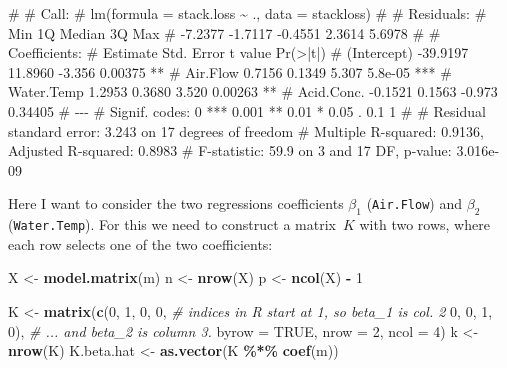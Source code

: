 \documentclass[
  a4paper,
]{article}
\newenvironment{Shaded}{\begin{snugshade}}{\end{snugshade}}
\newcommand{\AttributeTok}[1]{\textcolor[rgb]{0.13,0.29,0.53}{#1}}
\newcommand{\CommentTok}[1]{\textcolor[rgb]{0.56,0.35,0.01}{\textit{#1}}}
\newcommand{\ConstantTok}[1]{\textcolor[rgb]{0.56,0.35,0.01}{#1}}
\newcommand{\DecValTok}[1]{\textcolor[rgb]{0.00,0.00,0.81}{#1}}
\newcommand{\FunctionTok}[1]{\textcolor[rgb]{0.13,0.29,0.53}{\textbf{#1}}}
\newcommand{\NormalTok}[1]{#1}
\newcommand{\OtherTok}[1]{\textcolor[rgb]{0.56,0.35,0.01}{#1}}
\newcommand{\SpecialCharTok}[1]{\textcolor[rgb]{0.81,0.36,0.00}{\textbf{#1}}}
\theoremstyle{definition}
\theoremstyle{definition}
\theoremstyle{definition}
\theoremstyle{definition}
\theoremstyle{remark}
\begin{document}
\begin{Shaded}
\begin{Highlighting}[]
\NormalTok{\# }
\NormalTok{\# Call:}
\NormalTok{\# lm(formula = stack.loss \textasciitilde{} ., data = stackloss)}
\NormalTok{\# }
\NormalTok{\# Residuals:}
\NormalTok{\#     Min      1Q  Median      3Q     Max }
\NormalTok{\# {-}7.2377 {-}1.7117 {-}0.4551  2.3614  5.6978 }
\NormalTok{\# }
\NormalTok{\# Coefficients:}
\NormalTok{\#             Estimate Std. Error t value Pr(\textgreater{}|t|)    }
\NormalTok{\# (Intercept) {-}39.9197    11.8960  {-}3.356  0.00375 ** }
\NormalTok{\# Air.Flow      0.7156     0.1349   5.307  5.8e{-}05 ***}
\NormalTok{\# Water.Temp    1.2953     0.3680   3.520  0.00263 ** }
\NormalTok{\# Acid.Conc.   {-}0.1521     0.1563  {-}0.973  0.34405    }
\NormalTok{\# {-}{-}{-}}
\NormalTok{\# Signif. codes:  0 \textquotesingle{}***\textquotesingle{} 0.001 \textquotesingle{}**\textquotesingle{} 0.01 \textquotesingle{}*\textquotesingle{} 0.05 \textquotesingle{}.\textquotesingle{} 0.1 \textquotesingle{} \textquotesingle{} 1}
\NormalTok{\# }
\NormalTok{\# Residual standard error: 3.243 on 17 degrees of freedom}
\NormalTok{\# Multiple R{-}squared:  0.9136,  Adjusted R{-}squared:  0.8983 }
\NormalTok{\# F{-}statistic:  59.9 on 3 and 17 DF,  p{-}value: 3.016e{-}09}
\end{Highlighting}
\end{Shaded}

Here I want to consider the two regressions coefficients \(\beta_1\) (\texttt{Air.Flow})
and \(\beta_2\) (\texttt{Water.Temp}). For this we need to construct a matrix~\(K\)
with two rows, where each row selects one of the two coefficients:

\begin{Shaded}
\begin{Highlighting}[]
\NormalTok{X }\OtherTok{\textless{}{-}} \FunctionTok{model.matrix}\NormalTok{(m)}
\NormalTok{n }\OtherTok{\textless{}{-}} \FunctionTok{nrow}\NormalTok{(X)}
\NormalTok{p }\OtherTok{\textless{}{-}} \FunctionTok{ncol}\NormalTok{(X) }\SpecialCharTok{{-}} \DecValTok{1}

\NormalTok{K }\OtherTok{\textless{}{-}} \FunctionTok{matrix}\NormalTok{(}\FunctionTok{c}\NormalTok{(}\DecValTok{0}\NormalTok{, }\DecValTok{1}\NormalTok{, }\DecValTok{0}\NormalTok{, }\DecValTok{0}\NormalTok{,   }\CommentTok{\# indices in R start at 1, so beta\_1 is col. 2}
              \DecValTok{0}\NormalTok{, }\DecValTok{0}\NormalTok{, }\DecValTok{1}\NormalTok{, }\DecValTok{0}\NormalTok{),  }\CommentTok{\# ... and beta\_2 is column 3.}
            \AttributeTok{byrow =} \ConstantTok{TRUE}\NormalTok{,}
            \AttributeTok{nrow =} \DecValTok{2}\NormalTok{, }\AttributeTok{ncol =} \DecValTok{4}\NormalTok{)}
\NormalTok{k }\OtherTok{\textless{}{-}} \FunctionTok{nrow}\NormalTok{(K)}
\NormalTok{K.beta.hat }\OtherTok{\textless{}{-}} \FunctionTok{as.vector}\NormalTok{(K }\SpecialCharTok{\%*\%} \FunctionTok{coef}\NormalTok{(m))}
\end{Highlighting}
\end{Shaded}
\end{document}
